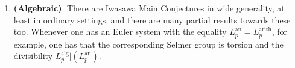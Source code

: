 \documentclass[a4paper,10pt, english, reqno]{smfart}
\numberwithin{equation}{section}
\begin{document}
\begin{enumerate}
    Where an Euler system exists, one can apply a Perrin-Riou logarithm map and extract an arithmetic $p$-adic $L$-function; but proving an explicit reciprocity law is harder still. Such reciprocity laws were studied in the Rankin--Selberg setting in \cite{KLZ17}, for diagonal cycles in \cite{DiagonalAsterisque}, and for $\mathrm{GSp}_4$ in \cite{LZ20}. For a precise summary of the double- and triple-product settings, see \cite[\S B]{LoefflerRiveroEisenstein}.
	
	
	
	\item \textbf{(Algebraic)}. There are Iwasawa Main Conjectures in wide generality, at least in ordinary settings, and there are many partial results towards these too. Whenever one has an Euler system with the equality $L_p^{\mathrm{an}} = L_p^{\mathrm{arith}}$, for example, one has that the corresponding Selmer group is torsion and the divisibility $L_p^{\mathrm{alg}} | (L_p^{\mathrm{an}})$. 
	
\end{enumerate}


\small
{}
{}

\end{document}
